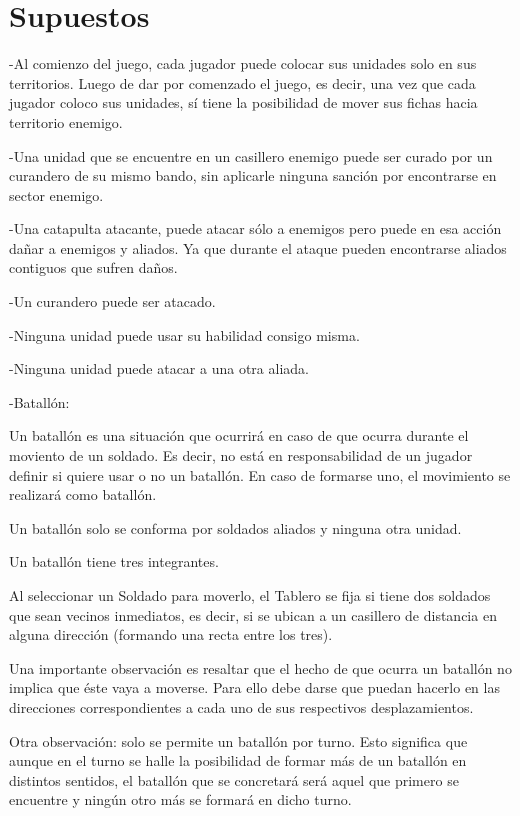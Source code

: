\documentclass[titlepage,a4paper]{article}
\begin{document}
\section{Supuestos}\label{sec:supuestos}

-Al comienzo del juego, cada jugador puede colocar sus unidades solo en sus territorios. Luego de dar por comenzado el juego, es decir, una vez que cada jugador coloco sus unidades, sí tiene la posibilidad de mover sus fichas hacia territorio enemigo. 

-Una unidad que se encuentre en un casillero enemigo puede ser curado por un curandero de su mismo bando, sin aplicarle ninguna sanción por encontrarse en sector enemigo. 


-Una catapulta atacante, puede atacar sólo a enemigos pero puede en esa acción dañar a enemigos y aliados. Ya que durante el ataque pueden encontrarse aliados contiguos que sufren daños. 

-Un curandero puede ser atacado. 

-Ninguna unidad puede usar su habilidad consigo misma. 

-Ninguna unidad puede atacar a una otra aliada.

-Batallón: 

Un batallón es una situación que ocurrirá en caso de que ocurra durante el moviento de un soldado. Es decir, no está en responsabilidad de un jugador definir si quiere usar o no un batallón. En caso de formarse uno, el movimiento se realizará como batallón. 

Un batallón solo se conforma por soldados aliados y ninguna otra unidad.

Un batallón tiene tres integrantes. 

Al seleccionar un Soldado para moverlo, el Tablero se fija si tiene dos soldados que sean vecinos inmediatos, es decir, si se ubican a un casillero de distancia en alguna dirección (formando una recta entre los tres).

Una importante observación es resaltar que el hecho de que ocurra un batallón no implica que éste vaya a moverse. Para ello debe darse que puedan hacerlo en las direcciones correspondientes a cada uno de sus respectivos desplazamientos. 


Otra observación: solo se permite un batallón por turno. Esto significa que aunque en el turno se halle la posibilidad de formar más de un batallón en distintos sentidos, el batallón que se concretará será aquel que primero se encuentre y ningún otro más se formará en dicho turno. 
\end{document}
